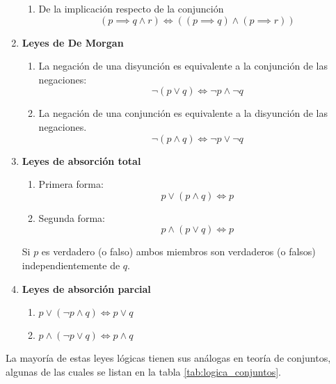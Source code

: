 \begin{enumerate}
\begin{enumerate}[label=\alph*)]
		\item De la implicación respecto de la conjunción
		\[ \left( p \implies q \land r \right) \iff \left( (p \implies q) \land (p \implies r) \right) \]
	\end{enumerate}
	\item \textbf{Leyes de De Morgan}
	\begin{enumerate}[label=\alph*)]
		\item La negación de una disyunción es equivalente a la conjunción de las negaciones:
		\[ \neg (p \lor q) \iff \neg p \land \neg q\]
		\item La negación de  una conjunción es equivalente a la disyunción de las negaciones.
		\[ \neg (p \land q) \iff \neg p \lor \neg q \]
	\end{enumerate}
	
	\item \textbf{Leyes de absorción total}
	\begin{enumerate}
		\item Primera forma: \[ p \lor (p \land q) \iff p \]
		\item Segunda forma: \[ p \land (p \lor q) \iff p \]
	\end{enumerate}
	Si $p$ es verdadero (o falso) ambos miembros son verdaderos (o falsos) independientemente de $q$.
	
	\item \textbf{Leyes de absorción parcial}
	\begin{enumerate}
		\item \( p \lor \left(\neg p \land q\right) \iff p \lor q \)
		\item \( p \land \left(\neg p \lor q\right) \iff p \land q \)
	\end{enumerate}
\end{enumerate}

La mayoría de estas leyes lógicas tienen sus análogas en teoría de conjuntos, algunas de las cuales se listan en la tabla \ref{tab:logica_conjuntos}.

